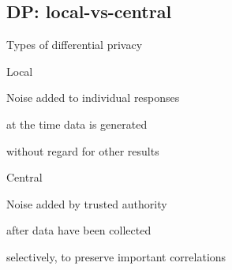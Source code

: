 \documentclass[xor=table]{beamer}
\def\itemsymbol{\textbullet}
\let\svpar\par
\let\svitemize\itemize
\let\svenditemize\enditemize
\let\svitem\item
\let\svcenter\center
\let\svendcenter\endcenter
\let\svcolumn\column
\let\svendcolumn\endcolumn
\def\newitem{\renewcommand\item[1][\itemsymbol]{\vfill\svitem[##1]}}%
\def\newpar{\def\par{\svpar\vfill}}%
\newcommand\stretchon{%
  \newpar%
  \renewcommand\item[1][\itemsymbol]{\svitem[##1]\newitem}%
  \renewenvironment{itemize}%
    {\svitemize}{\svenditemize\newpar\par}%
  \renewenvironment{center}%
    {\svcenter\newpar}{\svendcenter\newpar}%
  \renewenvironment{column}[2]%
    {\svcolumn{##1}\setlength{\parskip}{\columnskip}##2}%
    {\svendcolumn\vspace{\columnskip}}%
}
\begin{document}
\subsection*{DP: local-vs-central}
\stretchon
\begin{frame}{Types of differential privacy}
\begin{multicols}{2}

\begin{itemize}
\item Local
	\begin{itemize}
	\item Noise added to individual responses
	\item at the time data is generated
	\item without regard for other results
	\end{itemize}
\end{itemize}

\columnbreak

\begin{itemize}
\item Central
	\begin{itemize}
	\item Noise added by trusted authority
	\item after data have been collected
	\item selectively, to preserve important correlations
	\end{itemize}
\end{itemize}

\end{multicols}
\end{frame}



\end{document}
